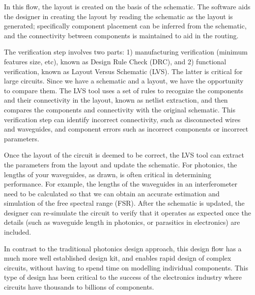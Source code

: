 \documentclass[journal]{spie}
\begin{document}
In this flow, the layout is created on the basis of the schematic.  The software aids the designer in creating the layout by reading the schematic as the layout is generated; specifically component placement can be inferred from the schematic, and the connectivity between components is maintained to aid in the routing.

The verification step involves two parts: 1) manufacturing verification (minimum features size, etc), known as Design Rule Check (DRC), and 2) functional verification, known as Layout Versus Schematic  (LVS).  The latter is critical for large circuits.  Since we have a schematic and a layout, we have the opportunity to compare them.  The LVS tool uses a set of rules to recognize the components and their connectivity in the layout, known as netlist extraction, and then compares the components and connectivity with the original schematic.  This verification step can identify incorrect connectivity, such as disconnected wires and waveguides, and component errors such as incorrect components or incorrect parameters.

Once the layout of the circuit is deemed to be correct, the LVS tool can extract the parameters from the layout and update the schematic.  For photonics, the lengths of your waveguides, as drawn, is often critical in determining performance.  For example, the lengths of the waveguides in an interferometer need to be calculated so that we can obtain an accurate estimation and simulation of the free spectral range (FSR). After the schematic is updated, the designer can re-simulate the circuit to verify that it operates as expected once the details (such as waveguide length in photonics, or parasitics in electronics) are included.


In contrast to the traditional photonics design approach, this design flow has a much more well established design kit, and enables rapid design of complex circuits, without having to spend time on modelling individual components.  This type of design has been critical to the success of the electronics industry where circuits have thousands to billions of components.
\end{document}

